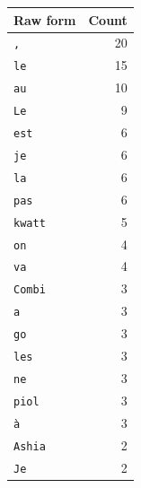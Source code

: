 \begin{tabular}{@{}lr@{}}
\toprule
\textbf{Raw form} & \textbf{Count} \\
\midrule
\texttt{,} & 20 \\
\texttt{le} & 15 \\
\texttt{au} & 10 \\
\texttt{Le} & 9 \\
\texttt{est} & 6 \\
\texttt{je} & 6 \\
\texttt{la} & 6 \\
\texttt{pas} & 6 \\
\texttt{kwatt} & 5 \\
\texttt{on} & 4 \\
\texttt{va} & 4 \\
\texttt{Combi} & 3 \\
\texttt{a} & 3 \\
\texttt{go} & 3 \\
\texttt{les} & 3 \\
\texttt{ne} & 3 \\
\texttt{piol} & 3 \\
\texttt{à} & 3 \\
\texttt{Ashia} & 2 \\
\texttt{Je} & 2 \\
\bottomrule
\end{tabular}
